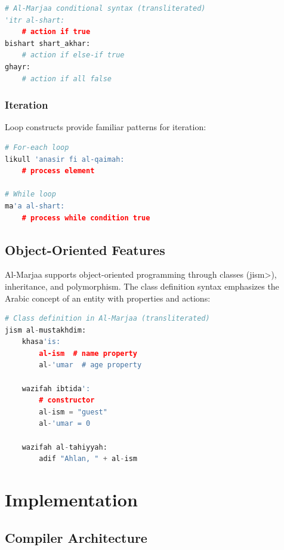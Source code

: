 \documentclass[11pt,a4paper]{article}
\begin{document}
\begin{lstlisting}[language=Python, caption=Conditional Structure Example]
# Al-Marjaa conditional syntax (transliterated)
'itr al-shart:
    # action if true
bishart shart_akhar:
    # action if else-if true
ghayr:
    # action if all false
\end{lstlisting}

\subsubsection{Iteration}

Loop constructs provide familiar patterns for iteration:

\begin{lstlisting}[language=Python, caption=Iteration Examples]
# For-each loop
likull 'anasir fi al-qaimah:
    # process element

# While loop
ma'a al-shart:
    # process while condition true
\end{lstlisting}

\subsection{Object-Oriented Features}

Al-Marjaa supports object-oriented programming through classes (\<jism>), inheritance, and polymorphism. The class definition syntax emphasizes the Arabic concept of an entity with properties and actions:

\begin{lstlisting}[language=Python, caption=Class Definition Example]
# Class definition in Al-Marjaa (transliterated)
jism al-mustakhdim:
    khasa'is:
        al-ism  # name property
        al-'umar  # age property
    
    wazifah ibtida':
        # constructor
        al-ism = "guest"
        al-'umar = 0
    
    wazifah al-tahiyyah:
        adif "Ahlan, " + al-ism
\end{lstlisting}

\section{Implementation}

\subsection{Compiler Architecture}
\end{document}
